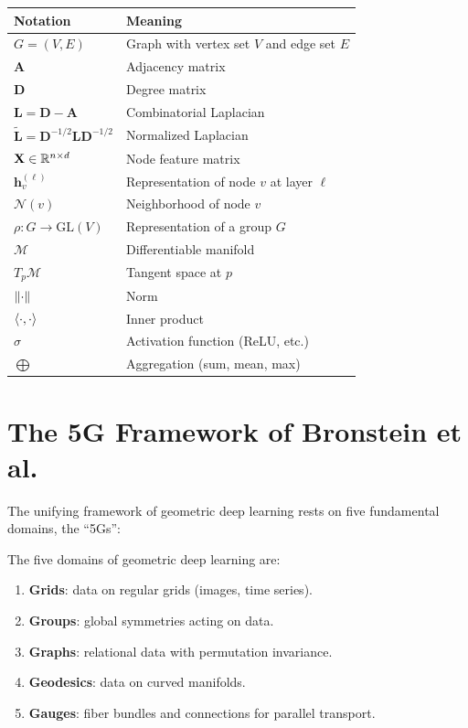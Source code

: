 \begin{center}
\begin{tabular}{ll}
\toprule
\textbf{Notation} & \textbf{Meaning} \\
\midrule
$G = (V, E)$ & Graph with vertex set $V$ and edge set $E$ \\
$\mathbf{A}$ & Adjacency matrix \\
$\mathbf{D}$ & Degree matrix \\
$\mathbf{L} = \mathbf{D} - \mathbf{A}$ & Combinatorial Laplacian \\
$\tilde{\mathbf{L}} = \mathbf{D}^{-1/2}\mathbf{L}\mathbf{D}^{-1/2}$ & Normalized Laplacian \\
$\mathbf{X} \in \mathbb{R}^{n \times d}$ & Node feature matrix \\
$\mathbf{h}_v^{(\ell)}$ & Representation of node $v$ at layer $\ell$ \\
$\mathcal{N}(v)$ & Neighborhood of node $v$ \\
$\rho: G \to \mathrm{GL}(V)$ & Representation of a group $G$ \\
$\mathcal{M}$ & Differentiable manifold \\
$T_p\mathcal{M}$ & Tangent space at $p$ \\
$\left\| \cdot \right\|$ & Norm \\
$\langle \cdot, \cdot \rangle$ & Inner product \\
$\sigma$ & Activation function (ReLU, etc.) \\
$\bigoplus$ & Aggregation (sum, mean, max) \\
\bottomrule
\end{tabular}
\end{center}

\section*{The 5G Framework of Bronstein et al.}

The unifying framework of geometric deep learning rests on five fundamental
domains, the ``5Gs'':

\begin{definition}[The 5Gs]
The five domains of geometric deep learning are:
\begin{enumerate}
    \item \textbf{Grids}: data on regular grids (images, time series).
    \item \textbf{Groups}: global symmetries acting on data.
    \item \textbf{Graphs}: relational data with permutation invariance.
    \item \textbf{Geodesics}: data on curved manifolds.
    \item \textbf{Gauges}: fiber bundles and connections for parallel transport.
\end{enumerate}
\end{definition}

